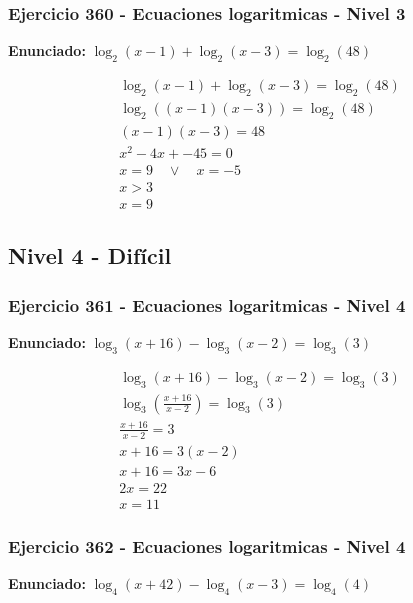 \documentclass[12pt,a4paper]{article}
\begin{document}
\subsubsection*{Ejercicio 360 - Ecuaciones logaritmicas - Nivel 3}
\textbf{Enunciado:} \(\log_{2}\left(x-1\right)+\log_{2}\left(x-3\right)=\log_{2}\left(48\right)\)

\[
\begin{aligned}
\log_{2}\left(x-1\right)+\log_{2}\left(x-3\right)=\log_{2}\left(48\right)\\
\log_{2}\left((x-1)(x-3)\right)=\log_{2}\left(48\right)\\
(x-1)(x-3)=48\\
x^2-4x+-45=0\\
x=9\quad \vee\quad x=-5\\
x>3\\
\boxed{x=9}
\end{aligned}
\]


\newpage

\subsection*{Nivel 4 - Difícil}

\subsubsection*{Ejercicio 361 - Ecuaciones logaritmicas - Nivel 4}
\textbf{Enunciado:} \(\log_{3}\left(x+16\right) - \log_{3}\left(x-2\right)=\log_{3}\left(3\right)\)

\[
\begin{aligned}
\log_{3}\left(x+16\right) - \log_{3}\left(x-2\right)=\log_{3}\left(3\right)\\
\log_{3}\left(\frac{x+16}{x-2}\right)=\log_{3}\left(3\right)\\
\frac{x+16}{x-2}=3\\
x+16=3(x-2)\\
x+16=3x-6\\
2x=22\\
\boxed{x=11}
\end{aligned}
\]


\subsubsection*{Ejercicio 362 - Ecuaciones logaritmicas - Nivel 4}
\textbf{Enunciado:} \(\log_{4}\left(x+42\right) - \log_{4}\left(x-3\right)=\log_{4}\left(4\right)\)
\end{document}
